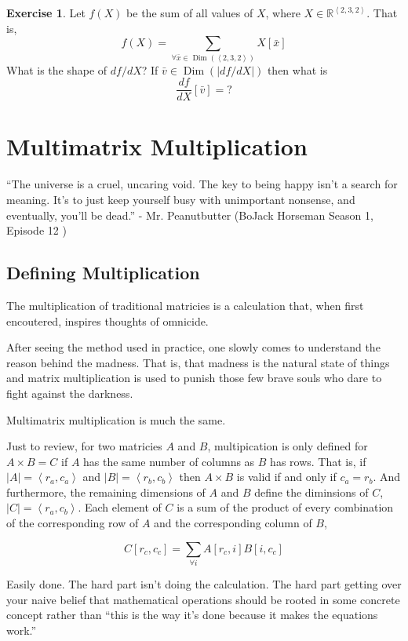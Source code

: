 \documentclass[12pt]{book}
\theoremstyle{plain}
\theoremstyle{definition}
\newtheorem{exercise}{Exercise}[chapter]
\theoremstyle{ppart}
\theoremstyle{case}
\theoremstyle{solution}
\DeclareMathOperator{\Dim}{Dim}
\begin{document}
\begin{exercise}
Let $f(X)$ be the sum of all values of $X$, where
$X \in \mathbb{R}^{\left<2,3,2\right>}$. That is,
\[ f(X) = \sum_{\forall \bar{x} \in \Dim(\left<2,3,2\right>)} X[\bar{x}] \]
What is the shape of $df/dX$? If $\bar{v} \in \Dim(|df/dX|)$ then what is
\[ \frac{df}{dX}[\bar{v}] = ? \]
\end{exercise}

\chapter{Multimatrix Multiplication}

\begin{displayquote}
``The universe is a cruel, uncaring void. The key to being happy isn't a search
for meaning. It's to just keep yourself busy with unimportant nonsense, and eventually,
you'll be dead.'' - Mr. Peanutbutter (BoJack Horseman Season 1, Episode 12
\cite{bojack})
\end{displayquote}

\section{Defining Multiplication}

The multiplication of traditional matricies is a calculation that, when first
encoutered, inspires thoughts of omnicide.

After seeing the method used in practice, one slowly comes to understand the
reason behind the madness. That is, that madness is the natural state of things
and matrix multiplication is used to punish those few brave souls who dare to
fight against the darkness.

Multimatrix multiplication is much the same.

Just to review, for two matricies $A$ and $B$, multipication is only defined
for $A \times B = C$ if $A$ has the same number of columns as $B$ has rows.
That is, if $|A| = \left< r_a, c_a \right>$ and $|B| = \left< r_b, c_b \right>$
then $A \times B$ is valid if and only if $c_a = r_b$. And furthermore,
the remaining dimensions of $A$ and $B$ define the diminsions of $C$,
$|C| = \left< r_a, c_b \right>$. Each element of $C$ is a sum of the product of
every combination of the corresponding row of $A$ and the corresponding column of
$B$,

\[ C[r_c, c_c] = \sum_{\forall i} A[r_c, i] B[i, c_c] \]

Easily done. The hard part isn't doing the calculation. The hard part getting over
your naive belief that mathematical operations should be rooted in some concrete
concept rather than ``this is the way it's done because it makes the equations
work.''
\end{document}
